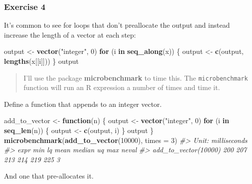 \documentclass[]{book}
\newenvironment{Shaded}{\begin{snugshade}}{\end{snugshade}}
\newcommand{\CommentTok}[1]{\textcolor[rgb]{0.56,0.35,0.01}{\textit{#1}}}
\newcommand{\ControlFlowTok}[1]{\textcolor[rgb]{0.13,0.29,0.53}{\textbf{#1}}}
\newcommand{\DataTypeTok}[1]{\textcolor[rgb]{0.13,0.29,0.53}{#1}}
\newcommand{\DecValTok}[1]{\textcolor[rgb]{0.00,0.00,0.81}{#1}}
\newcommand{\KeywordTok}[1]{\textcolor[rgb]{0.13,0.29,0.53}{\textbf{#1}}}
\newcommand{\NormalTok}[1]{#1}
\newcommand{\StringTok}[1]{\textcolor[rgb]{0.31,0.60,0.02}{#1}}
\theoremstyle{plain}
\theoremstyle{remark}
\theoremstyle{definition}
\theoremstyle{definition}
\theoremstyle{definition}
\theoremstyle{remark}
\begin{document}
\hypertarget{exercise-4-32}{%
\subsubsection{Exercise 4}\label{exercise-4-32}}

It's common to see for loops that don't preallocate the output and
instead increase the length of a vector at each step:

\begin{Shaded}
\begin{Highlighting}[]
\NormalTok{output <-}\StringTok{ }\KeywordTok{vector}\NormalTok{(}\StringTok{"integer"}\NormalTok{, }\DecValTok{0}\NormalTok{)}
\ControlFlowTok{for}\NormalTok{ (i }\ControlFlowTok{in} \KeywordTok{seq_along}\NormalTok{(x)) \{}
\NormalTok{  output <-}\StringTok{ }\KeywordTok{c}\NormalTok{(output, }\KeywordTok{lengths}\NormalTok{(x[[i]]))}
\NormalTok{\}}
\NormalTok{output}
\end{Highlighting}
\end{Shaded}

\begin{quote}
I'll use the package \textbf{microbenchmark} to time this. The
\texttt{microbenchmark} function will run an R expression a number of
times and time it.
\end{quote}

Define a function that appends to an integer vector.

\begin{Shaded}
\begin{Highlighting}[]
\NormalTok{add_to_vector <-}\StringTok{ }\ControlFlowTok{function}\NormalTok{(n) \{}
\NormalTok{  output <-}\StringTok{ }\KeywordTok{vector}\NormalTok{(}\StringTok{"integer"}\NormalTok{, }\DecValTok{0}\NormalTok{)}
  \ControlFlowTok{for}\NormalTok{ (i }\ControlFlowTok{in} \KeywordTok{seq_len}\NormalTok{(n)) \{}
\NormalTok{    output <-}\StringTok{ }\KeywordTok{c}\NormalTok{(output, i)}
\NormalTok{  \}}
\NormalTok{  output  }
\NormalTok{\}}
\KeywordTok{microbenchmark}\NormalTok{(}\KeywordTok{add_to_vector}\NormalTok{(}\DecValTok{10000}\NormalTok{), }\DataTypeTok{times =} \DecValTok{3}\NormalTok{)}
\CommentTok{#> Unit: milliseconds}
\CommentTok{#>                  expr min  lq mean median  uq max neval}
\CommentTok{#>  add_to_vector(10000) 200 207  213    214 219 225     3}
\end{Highlighting}
\end{Shaded}

And one that pre-allocates it.
\end{document}
